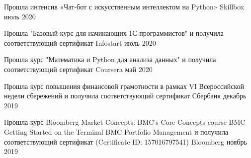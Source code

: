 \documentclass[]{awesome-cv}
\begin{document}
\begin{cventries}
	\cventry
		{}
	{Прошла интенсив «Чат-бот с искусственным интеллектом на Python»}
	{Skillbox
	\newline июль 2020}
	{}
	{}
	\end{cventries} \vspace{-7mm}\begin{cventries}
	\cventry
		{}
	{Прошла "Базовый курс для начинающих 1С-программистов"  и получила соответствующий сертификат }
	{Infostart
	\newline июль 2020}
	{}
	{}
	\end{cventries} \vspace{-7mm}\begin{cventries}
	\cventry
		{}
	{Прошла курс "Математика и Python для анализа данных"  и получила соответствующий сертификат }
	{Coursera
	\newline май 2020}
	{}
	{}
	\end{cventries} \vspace{-7mm} \begin{cventries}
	\cventry
{}
	{Прошла курс повышения финансовой грамотности в рамках VI Всероссийской недели сбережений и получила соответствующий сертификат}
	{Сбербанк
	\newline декабрь 2019}
	{}
	{}
	\end{cventries}\vspace{-7mm}  \begin{cventries}
	
	\cventry
		{}
	{Прошла курс Bloomberg Market Concepts:
	\newline \quad \bullet BMC's Core Concepts course
	\newline \quad \bullet BMC Getting Started on the Terminal
	\newline \quad \bullet BMC Portfolio Management
	\newline \quad и получила соответствующий сертификат (Certificate ID: 157016797541)}
	{Bloomberg
	\newline ноябрь 2019}
	{}
	{}
	\end{cventries} 
	\vspace{-7mm}
	
\end{document}
